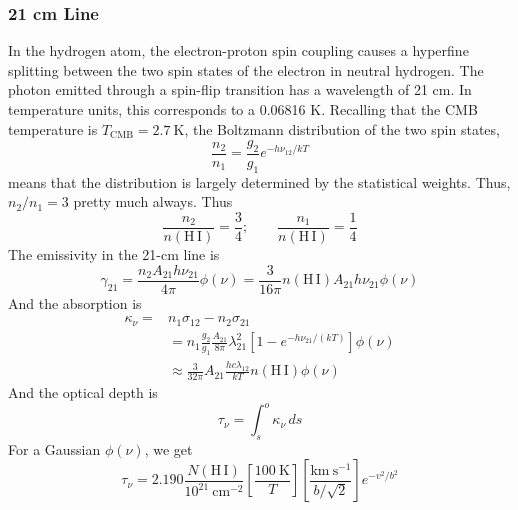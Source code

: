 \documentclass[10pt]{article}
\numberwithin{equation}{section}
\begin{document}
\subsubsection{21 cm Line} %
\label{ssub:21_cm_line}
In the hydrogen atom, the electron-proton spin coupling causes a hyperfine
splitting between the two spin states of the electron in neutral hydrogen. The
photon emitted through a spin-flip transition has a wavelength of 21 cm. In
temperature units, this corresponds to a 0.06816 K. Recalling that the CMB
temperature is $T_{\mathrm{CMB}} = 2.7\ \mathrm{K}$, the Boltzmann distribution
of the two spin states,
\begin{equation}
  \label{eq:21cm:1} \frac{n_2}{n_1} = \frac{g_2}{g_1} e^{-h\nu_{12}/kT}
\end{equation}
means that the distribution is largely determined by the statistical weights.
Thus, $n_2/n_1 = 3$ pretty much always. Thus
\begin{equation}
  \label{eq:21cm:2} \frac{n_2}{n(\mathrm{H\,I})} = \frac{3}{4}; \qquad
  \frac{n_1}{n(\mathrm{H\,I})} = \frac{1}{4}
\end{equation}
The emissivity in the 21-cm line is
\begin{equation}
  \label{eq:21cm:3} \gamma_{21} = \frac{n_2 A_{21} h\nu_{21}}{4\pi} \phi(\nu) =
  \frac{3}{16\pi} n(\mathrm{H\,I})A_{21}h\nu_{21}\phi(\nu)
\end{equation}
And the absorption is
\begin{align}
  \label{eq:21cm:4} \kappa_\nu =& n_1\sigma_{12} - n_2\sigma_{21}\\
  \label{eq:21cm:5} &= n_1 \frac{g_2}{g_1} \frac{A_{21}}{8\pi} \lambda_{21}^2
  \left[1 - e^{-h\nu_{21}/(kT)}\right]\phi(\nu)\\
  \label{eq:21cm:6} &\approx \frac{3}{32\pi} A_{21}\frac{hc \lambda_{12}}{kT}
  n(\mathrm{H\,I})\phi(\nu)
\end{align}
And the optical depth is
\begin{equation}
  \label{eq:21cm:7} \tau_\nu = \int_s^o\kappa_\nu\,ds
\end{equation}
For a Gaussian $\phi(\nu)$, we get
\begin{equation}
  \label{eq:21cm:8} \tau_\nu = 2.190 \frac{N(\mathrm{H\,I})}{10^{21}\
  \mathrm{cm^{-2}}}\left[\frac{100\
  \mathrm{K}}{T}\right]\left[\frac{\mathrm{km\ s^{-1}}}{b/\sqrt{2}}\right]e^{-v^
  2/b^2}
\end{equation}
\end{document}
